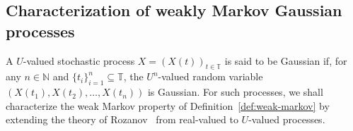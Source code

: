 \documentclass[reqno]{amsart}
\numberwithin{equation}{section}
\newcommand{\bbT}{\mathbb{T}}
\newcommand{\N}{\mathbb{N}}
\theoremstyle{remark}
\theoremstyle{definition}
\begin{document}
\subsection{Characterization of weakly Markov Gaussian processes}
\label{subsec:weakMarkov-gaussian}
A $U$-valued stochastic process $X = (X(t))_{t \in \bbT}$ is said to be Gaussian if,
for any $n \in \N$ and $\{t_i\}_{i=1}^n \subseteq \bbT$,
the $U^n$-valued random variable
$(X(t_1), X(t_2), \dots, X(t_n))$ is Gaussian.
For such processes, we shall characterize the weak Markov property of Definition~\ref{def:weak-markov}
by extending the theory of Rozanov~\cite{Rozanov1982}
from real-valued to $U$-valued processes.
\end{document}
